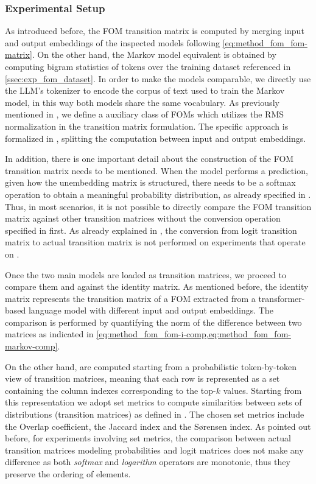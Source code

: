 \subsubsection{Experimental Setup}

As introduced before, the FOM transition matrix is computed by merging input and output embeddings of the inspected models following \cref{eq:method_fom_fom-matrix}.
On the other hand, the Markov model equivalent is obtained by computing bigram statistics of tokens over the training dataset referenced in \cref{ssec:exp_fom_dataset}.
In order to make the models comparable, we directly use the LLM's tokenizer to encode the corpus of text used to train the Markov model, in this way both models share the same vocabulary.
As previously mentioned in , we define a auxiliary class of FOMs which utilizes the RMS normalization in the transition matrix formulation.
The specific approach is formalized in , splitting the computation between input and output embeddings.

In addition, there is one important detail about the construction of the FOM transition matrix  needs to be mentioned.
When the model performs a prediction, given how the unembedding matrix is structured, there needs to be a softmax operation to obtain a meaningful probability distribution, as already specified in .
Thus, in most scenarios, it is not possible to directly compare the FOM transition matrix against other transition matrices without  the conversion operation specified in  first.
As already explained in , the conversion from logit transition matrix to actual transition matrix is not performed on experiments that operate on .

Once the two main models are loaded as transition matrices, we proceed to compare them  and against the identity matrix.
As mentioned before, the identity matrix represents the transition matrix of a FOM extracted from a transformer-based language model with different input and output embeddings.
The comparison is performed by quantifying the norm of the difference between two matrices as indicated in \cref{eq:method_fom_fom-i-comp,eq:method_fom_fom-markov-comp}.

On the other hand,  are computed starting from a probabilistic token-by-token view of transition matrices, meaning that each row is represented as a set containing the column indexes corresponding to the top-$k$ values.
Starting from this representation we adopt set metrics to compute similarities between sets of distributions (transition matrices) as defined in .
The chosen set metrics include the Overlap coefficient, the Jaccard index and the S\o{}rensen index.
As pointed out before, for experiments involving set metrics, the comparison between actual transition matrices modeling probabilities and logit matrices does not make any difference as both \emph{softmax} and \emph{logarithm} operators are monotonic, thus they preserve the ordering of elements.

